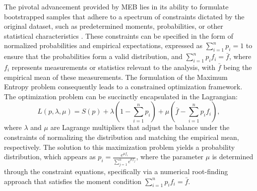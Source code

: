 \documentclass[11pt]{article}
\begin{document}
The pivotal advancement provided by MEB lies in its ability to formulate bootstrapped samples that adhere to a spectrum of constraints dictated by the original dataset, such as predetermined moments, probabilities, or other statistical characteristics \citep{berger1985statistical}. These constraints can be specified in the form of normalized probabilities and empirical expectations, expressed as $\sum_{i=1}^{n} p_i = 1$ to ensure that the probabilities form a valid distribution, and $\sum_{i=1}^{n} p_i f_i = \bar{f}$, where $f_i$ represents measurements or statistics relevant to the analysis, with $\bar{f}$ being the empirical mean of these measurements. The formulation of the Maximum Entropy problem consequently leads to a constrained optimization framework. The optimization problem can be succinctly encapsulated in the Lagrangian:
\begin{equation}
	L(p, \lambda, \mu) = S(p) + \lambda \left(1 - \sum_{i=1}^{n} p_i\right) + \mu \left(\bar{f} - \sum_{i=1}^{n} p_i f_i\right),
\end{equation}
where $\lambda$ and $\mu$ are Lagrange multipliers that adjust the balance under the constraints of normalizing the distribution and matching the empirical mean, respectively. The solution to this maximization problem yields a probability distribution, which appears as
$p_i = \frac{e^{\mu f_i}}{\sum_{j=1}^{n} e^{\mu f_j}}$,  where the parameter $\mu$ is determined through the constraint equations, specifically via a numerical root-finding approach that satisfies the moment condition $\sum_{i=1}^{n} p_i f_i = \bar{f}$.
\end{document}
